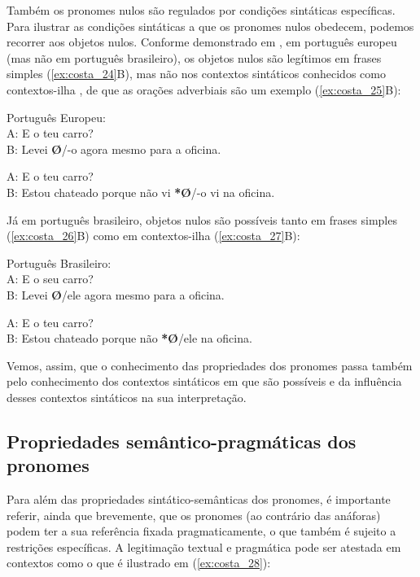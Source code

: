 \documentclass[output=paper]{LSP/langsci}
\begin{document}
Também os pronomes nulos são regulados por condições sintáticas específicas. Para ilustrar as condições sintáticas a que os pronomes nulos obedecem, podemos recorrer aos objetos nulos. Conforme demonstrado em \citet{raposo1986}, em português europeu (mas não em português brasileiro), os objetos nulos são legítimos em frases simples (\ref{ex:costa_24}B), mas não nos contextos sintáticos conhecidos como contextos-ilha \citep{ross1969}, de que as orações adverbiais são um exemplo (\ref{ex:costa_25}B):

\ea\label{ex:costa_24}
Português Europeu:\\
A: E o teu carro?\\
B: Levei \textbf{Ø}/-o agora mesmo para a oficina.
\z

\ea\label{ex:costa_25}
A: E o teu carro?\\
B: Estou chateado porque não vi \textbf{*Ø}/-o vi na oficina.
\z

Já em português brasileiro, objetos nulos são possíveis tanto em frases simples (\ref{ex:costa_26}B) como em contextos-ilha (\ref{ex:costa_27}B):

\ea\label{ex:costa_26}
Português Brasileiro:\\
A: E o seu carro?\\
B: Levei \textbf{Ø}/ele agora mesmo para a oficina.
\z

\ea\label{ex:costa_27}
A: E o teu carro?\\
B: Estou chateado porque não \textbf{*Ø}/ele na oficina.
\z

Vemos, assim, que o conhecimento das propriedades dos pronomes passa também pelo conhecimento dos contextos sintáticos em que são possíveis e da influência desses contextos sintáticos na sua interpretação.

\subsection{Propriedades semântico-pragmáticas dos pronomes}
\label{subsec:costa_propriedades_sem_prag_pronomes}

Para além das propriedades sintático-semânticas dos pronomes, é importante referir, ainda que brevemente, que os pronomes (ao contrário das anáforas) podem ter a sua referência fixada pragmaticamente, o que também é sujeito a restrições específicas. A legitimação textual e pragmática pode ser atestada em contextos como o que é ilustrado em (\ref{ex:costa_28}):
\end{document}
